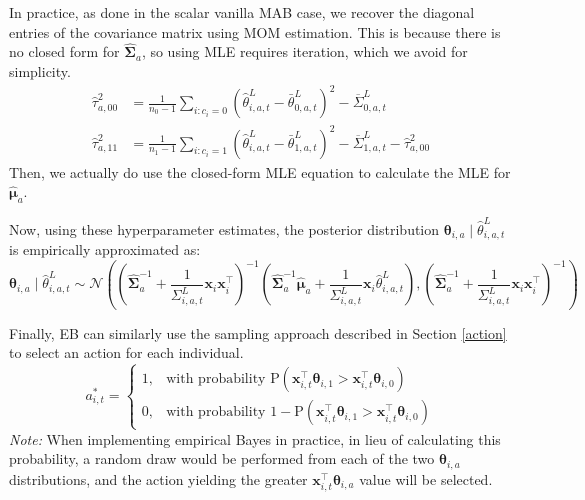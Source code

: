 \documentclass[letterpaper, 9pt]{extarticle}
\begin{document}
In practice, as done in the scalar vanilla MAB case, we recover the diagonal entries of the covariance matrix using MOM estimation. This is because there is no closed form for $\hat{\boldsymbol{\Sigma}}_a$, so using MLE requires iteration, which we avoid for simplicity. 
\begin{align*}
    \hat{\tau}_{a,00}^2 &= \frac{1}{n_0 - 1}\sum_{i: c_i=0}\left(\hat{\theta}^L_{i,a,t} - \bar{\theta}^L_{0,a,t}\right)^2 - \overline{\Sigma}^L_{0,a,t}\\
    \hat{\tau}_{a,11}^2 &= \frac{1}{n_1 - 1}\sum_{i: c_i=1}\left(\hat{\theta}^L_{i,a,t} - \bar{\theta}^L_{1,a,t}\right)^2 - \overline{\Sigma}^L_{1,a,t} - \hat{\tau}_{a,00}^2
\end{align*}
Then, we actually do use the closed-form MLE equation to calculate the MLE for $\hat{\boldsymbol{\mu}}_a$. 

Now, using these hyperparameter estimates, the  posterior distribution $\boldsymbol{\theta}_{i,a}
\mid
\hat{\theta}^{L}_{i,a,t}$ is empirically approximated as:
$$\boldsymbol{\theta}_{i,a}
\mid
\hat{\theta}^{L}_{i,a,t}
\sim
\mathcal{N}
\left(
\left(
\hat{\boldsymbol{\Sigma}}_a^{-1}
+
\frac{1}{\Sigma^{L}_{i,a,t}}
\boldsymbol{x}_i\boldsymbol{x}_i^\top
\right)^{-1}
\left(
\hat{\boldsymbol{\Sigma}}_a^{-1}\hat{\boldsymbol{\mu}}_a
+
\frac{1}{\Sigma^{L}_{i,a,t}}
\boldsymbol{x}_i \hat{\theta}^{L}_{i,a,t}
\right),
\left(
\hat{\boldsymbol{\Sigma}}_a^{-1}
+
\frac{1}{\Sigma^{L}_{i,a,t}}
\boldsymbol{x}_i\boldsymbol{x}_i^\top
\right)^{-1}
\right)$$

Finally, EB can similarly use the sampling approach described in Section \ref{action} to select an action for each individual.
$$a_{i,t}^* =
\begin{cases}
1, & \text{with probability }
\textrm{P}\!\left(
\boldsymbol{x}_{i,t}^\top \boldsymbol{\theta}_{i,1}
>
\boldsymbol{x}_{i,t}^\top \boldsymbol{\theta}_{i,0}
\right) \\[0em]
0, & \text{with probability }
1-
\textrm{P}\!\left(
\boldsymbol{x}_{i,t}^\top \boldsymbol{\theta}_{i,1}
>
\boldsymbol{x}_{i,t}^\top \boldsymbol{\theta}_{i,0}
\right)
\end{cases}$$
\textit{Note:} When implementing empirical Bayes in practice, in lieu of calculating this probability, a random draw would be performed from each of the two $\boldsymbol{\theta}_{i,a}$ distributions, and the action yielding the greater $\boldsymbol{x}_{i,t}^\top \boldsymbol{\theta}_{i,a}$ value will be selected.
\end{document}
